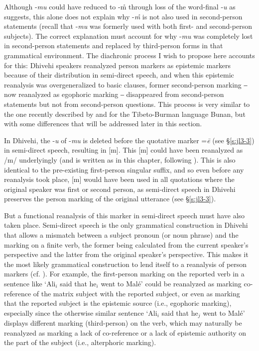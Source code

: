 \documentclass[output=paper]{langsci/langscibook}
\begin{document}
Although ‑\textit{mu} could have reduced to -m̊ through loss of the word-final ‑\textit{u} as \cite[169]{Fritz2002} suggests, this alone does not explain why -\textit{m̊} is not also used in second-person statements (recall that -\textit{mu} was formerly used with both first- and second-person subjects). The correct explanation must account for why -\textit{mu} was completely lost in second-person statements and replaced by third-person forms in that grammatical environment. The diachronic process I wish to propose here accounts for this: Dhivehi speakers reanalyzed person markers as epistemic markers because of their distribution in semi-direct speech, and when this epistemic reanalysis was overgeneralized to basic clauses, former second-person marking ‒ now reanalyzed as egophoric marking ‒ disappeared from second-person statements but not from second-person questions. This process is very similar to the one recently described by \cite{Widmer2015} and \cite{WidmerZemp2017} for the Tibeto-Burman language Bunan, but with some differences that will be addressed later in this section. 

In Dhivehi, the -\textit{u} of -\textit{mu} is deleted before the quotative marker =\textit{ē} (see §\ref{s:jl3-3}) in semi-direct speech, resulting in [m]. This [m] could have been reanalyzed as /m/ underlyingly (and is written as in this chapter, following \citealt{Gnanadesikan2017}). This is also identical to the pre-existing first-person singular suffix, and so even before any reanalysis took place, [m] would have been used in all quotations where the original speaker was first or second person, as semi-direct speech in Dhivehi preserves the person marking of the original utterance (see §\ref{s:jl3-3}). 

But a functional reanalysis of this marker in semi-direct speech must have also taken place. Semi-direct speech is the only grammatical construction in Dhivehi that allows a mismatch between a subject pronoun (or noun phrase) and the marking on a finite verb, the former being calculated from the current speaker’s perspective and the latter from the original speaker’s perspective. This makes it the most likely grammatical construction to lend itself to a reanalysis of person markers (cf. \citealt[54–56]{WidmerZemp2017}). For example, the first-person marking on the reported verb in a sentence like ‘Ali$_i$ said that he$_i$ went to Malé’ could be reanalyzed as marking co-reference of the matrix subject with the reported subject, or even as marking that the reported subject is the epistemic source (i.e., egophoric marking), especially since the otherwise similar sentence ‘Ali$_i$ said that he$_j$ went to Malé’ displays different marking (third-person) on the verb, which may naturally be reanalyzed as marking a lack of co-reference or a lack of epistemic authority on the part of the subject (i.e., alterphoric marking). 
\end{document}
